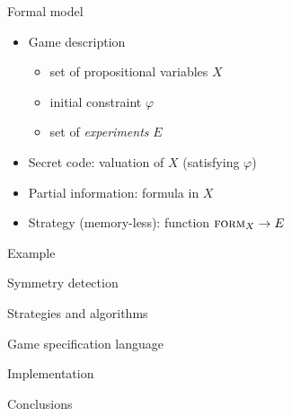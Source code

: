 \documentclass{beamer}
\begin{document}
\begin{frame}{Formal model}
\begin{itemize}
\item Game description
\begin{itemize}
\item set of propositional variables $X$
\item initial constraint $\varphi$
\item set of \emph{experiments} $E$
\end{itemize}

\item Secret code: valuation of $X$ (satisfying $\varphi$)
\item Partial information: formula in $X$
\item Strategy (memory-less): function $\textsc{form}_X \rightarrow E$
\end{itemize}
\end{frame}

\begin{frame}{Example}
\end{frame}

\begin{frame}{Symmetry detection}
\end{frame}

\begin{frame}{Strategies and algorithms}
\end{frame}

\begin{frame}{Game specification language}
\end{frame}

\begin{frame}{Implementation}
\end{frame}

\begin{frame}{Conclusions}
\end{frame}
\end{document}
